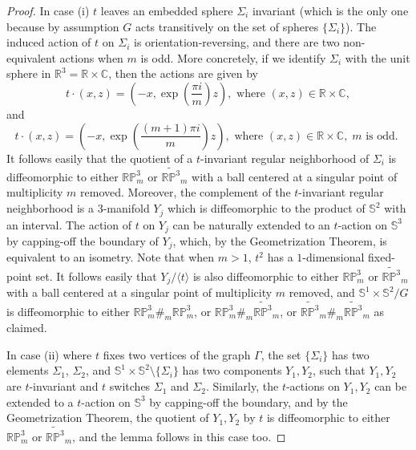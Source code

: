 \documentclass[11pt]{amsart}
\theoremstyle{plain}
\numberwithin{theorem}{section}
\theoremstyle{definition}
\begin{document}
\begin{proof}
In case (i) $t$ leaves an embedded sphere $\Sigma_i$ invariant (which is the only one because 
by assumption $G$ acts transitively on the set of spheres $\{\Sigma_i\}$). The induced action
of $t$ on $\Sigma_i$ is orientation-reversing, and there are two non-equivalent actions
when $m$ is odd. More concretely, if we identify $\Sigma_i$ with the unit sphere in 
${{\mathbb R}}^3={{\mathbb R}}\times{{\mathbb C}}$, then the actions are given by
$$
 t\cdot (x,z)=(-x,\exp(\frac{\pi i}{m}) z),  \mbox{ where } (x,z)\in {{\mathbb R}}\times {{\mathbb C}},
$$
and
$$
 t\cdot (x,z)=(-x,\exp(\frac{(m+1)\pi i}{m}) z),  \mbox{ where } (x,z)\in {{\mathbb R}}\times {{\mathbb C}}, \; m \mbox { is odd. }
$$
It follows easily that the quotient of a $t$-invariant regular neighborhood of $\Sigma_i$ is 
diffeomorphic to either ${{\mathbb R}}{{\mathbb P}}^3_m$ or $\widetilde{{{\mathbb R}}{{\mathbb P}}^3}_m$ with a ball centered at a 
singular point of multiplicity $m$ removed. Moreover, the complement of the $t$-invariant 
regular neighborhood is a $3$-manifold $Y_j$ which is diffeomorphic to the product of ${{\mathbb S}}^2$ 
with an interval. The action of $t$ on $Y_j$ can be naturally extended to an $t$-action on ${{\mathbb S}}^3$
by capping-off the boundary of $Y_j$, which, by the Geometrization Theorem, is equivalent to
an isometry. Note that when $m>1$, $t^2$ has a $1$-dimensional fixed-point set. It follows easily
that $Y_j/\langle t\rangle$ is also diffeomorphic to either ${{\mathbb R}}{{\mathbb P}}^3_m$ or $\widetilde{{{\mathbb R}}{{\mathbb P}}^3}_m$ 
with a ball centered at a singular point of multiplicity $m$ removed, and ${{\mathbb S}}^1\times{{\mathbb S}}^2/G$ is 
diffeomorphic to either ${{\mathbb R}}{{\mathbb P}}^3_m \#_{m} {{\mathbb R}}{{\mathbb P}}^3_m$, or ${{\mathbb R}}{{\mathbb P}}^3_m \#_{m} \widetilde{{{\mathbb R}}{{\mathbb P}}^3}_m$, 
or $\widetilde{{{\mathbb R}}{{\mathbb P}}^3}_m\#_{m} \widetilde{{{\mathbb R}}{{\mathbb P}}^3}_m$ as claimed. 

In case (ii) where $t$ fixes two vertices of the graph $\Gamma$, the set $\{\Sigma_i\}$ has two elements
$\Sigma_1$, $\Sigma_2$, and ${{\mathbb S}}^1\times{{\mathbb S}}^2\setminus \{\Sigma_i\}$ has two components $Y_1,Y_2$,
such that $Y_1,Y_2$ are $t$-invariant and $t$ switches $\Sigma_1$ and $\Sigma_2$. Similarly, 
the $t$-actions on $Y_1,Y_2$ can be extended to a $t$-action on ${{\mathbb S}}^3$ by capping-off the boundary, 
and by the Geometrization Theorem, the quotient of $Y_1,Y_2$ by $t$ is diffeomorphic to either 
${{\mathbb R}}{{\mathbb P}}^3_m$ or $\widetilde{{{\mathbb R}}{{\mathbb P}}^3}_m$, and the lemma follows in this case too. 

\end{proof}
\end{document}
